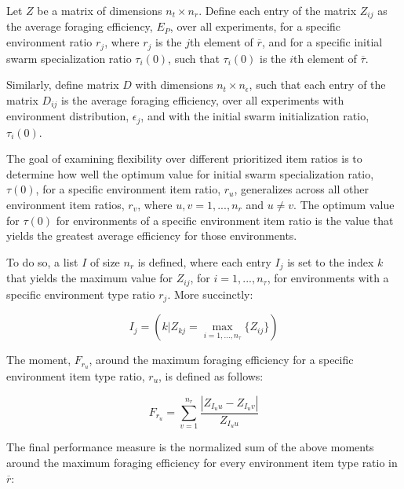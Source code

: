 \documentclass[preprint,12pt]{elsarticle}
\begin{document}
Let $Z$ be a matrix of dimensions $n_t \times n_r$. Define each entry of the matrix $Z_{ij}$ as the average foraging efficiency, $E_P$, over all experiments, for a specific environment ratio $r_j$, where $r_j$ is the $j$th element of $\overline{r}$, and for a specific initial swarm specialization ratio $\tau_i(0)$, such that $\tau_i(0)$ is the $i$th element of $\overline{\tau}$.

Similarly, define matrix $D$ with dimensions $n_t \times n_\epsilon$, such that each entry of the matrix $D_{ij}$ is the average foraging efficiency, over all experiments with environment distribution, $\epsilon_j$, and with the initial swarm initialization ratio, $\tau_i(0)$.



The goal of examining flexibility over different prioritized item ratios is to determine how well the optimum value for initial swarm specialization ratio, $\tau(0)$, for a specific environment item ratio, $r_u$, generalizes across all other environment item ratios, $r_v$, where $u,v = 1,...,n_r$ and $u \neq v$. The optimum value for $\tau(0)$ for environments of a specific environment item ratio is the value that yields the greatest average efficiency for those environments.

To do so, a list $I$ of size $n_r$ is defined, where each entry $I_j$ is set to the index $k$ that yields the maximum value for $Z_{ij}$, for $i = 1,..., n_\tau$, for environments with a specific environment type ratio $r_j$. More succinctly:

\begin{equation}
I_j = ( k | Z_{kj} = \max_{i=1,...,n_\tau}\{Z_{ij}\} )
\end{equation}

The moment, $F_{r_u}$, around the maximum foraging efficiency for a specific environment item type ratio, $r_u$, is defined as follows: 

\begin{equation}
F_{r_u} = \sum_{v=1}^{n_r}\dfrac{|Z_{I_uu}- Z_{I_uv}|}{Z_{I_uu}}
\end{equation}

The final performance measure is the normalized sum of the above moments around the maximum foraging efficiency for every environment item type ratio in $\overline{r}$:
\end{document}

